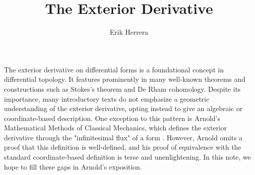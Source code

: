 \documentclass[12pt]{article}
\begin{document}

\lhead{}
\rhead{\today}
\title{The Exterior Derivative}
\author{Erik Herrera}

\maketitle

The exterior derivative on differential forms is a foundational concept in differential topology. It features prominently in many well-known theorems and constructions such as Stokes's theorem and De Rham cohomology. Despite its importance, many introductory texts do not emphasize a geometric understanding of the exterior derivative, opting instead to give an algebraic \cite{lee} or coordinate-based \cite{spivak} description. One exception to this pattern is Arnold's Mathematical Methods of Classical Mechanics, which defines the exterior derivative through the "infinitesimal flux" of a form \cite{arnold}. However, Arnold omits a proof that this definition is well-defined, and his proof of equivalence with the standard coordinate-based definition is terse and unenlightening. In this note, we hope to  fill these gaps in Arnold's exposition.
\end{document}
